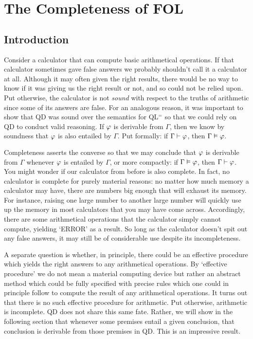 ﻿%
\chapter{The Completeness of FOL}
\label{ch.FOL-completeness}

\section{Introduction}
  \label{sec:Introduction}

Consider a calculator that can compute basic arithmetical operations.
If that calculator sometimes gave false answers we probably shouldn't call it a calculator at all.
Although it may often given the right results, there would be no way to know if it was giving us the right result or not, and so could not be relied upon.
Put otherwise, the calculator is not \textit{sound} with respect to the truths of arithmetic since some of its answers are false.
For an analogous reason, it was important to show that QD was sound over the semantics for QL$^=$ so that we could rely on QD to conduct valid reasoning.
If $\varphi$ is derivable from $\Gamma$, then we know by soundness that $\varphi$ is also entailed by $\Gamma$.
Put formally: if $\Gamma\vdash\varphi$, then $\Gamma\vDash\varphi$.

Completeness asserts the converse so that we may conclude that $\varphi$ is derivable from $\Gamma$ whenever $\varphi$ is entailed by $\Gamma$, or more compactly: if $\Gamma\vDash\varphi$, then $\Gamma\vdash\varphi$.
You might wonder if our calculator from before is also complete.
In fact, no calculator is complete for purely material reasons: no matter how much memory a calculator may have, there are numbers big enough that will exhaust its memory.
For instance, raising one large number to another large number will quickly use up the memory in most calculators that you may have come across.
Accordingly, there are some arithmetical operations that the calculator simply cannot compute, yielding `ERROR' as a result.
So long as the calculator doesn't spit out any false answers, it may still be of considerable use despite its incompleteness.

A separate question is whether, in principle, there could be an effective procedure which yields the right answers to any arithmetical operations.
By `effective procedure' we do not mean a material computing device but rather an abstract method which could be fully specified with precise rules which one could in principle follow to compute the result of any arithmetical operations.
It turns out that there is no such effective procedure for arithmetic.
Put otherwise, arithmetic is incomplete.
QD does not share this same fate.
Rather, we will show in the following section that whenever some premises entail a given conclusion, that conclusion is derivable from those premises in QD.
This is an impressive result.

